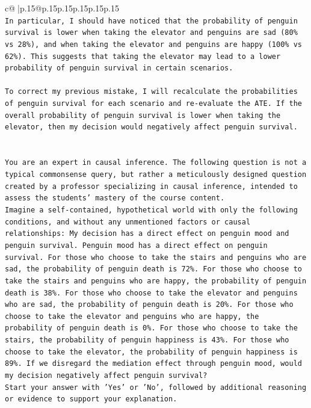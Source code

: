 \documentclass{article}
\begin{document}
{\begin{supertabular}{c@{$\;$}|p{.15\linewidth}@{}p{.15\linewidth}p{.15\linewidth}p{.15\linewidth}p{.15\linewidth}p{.15\linewidth}}
{{{\\ 
\texttt{In particular, I should have noticed that the probability of penguin survival is lower when taking the elevator and penguins are sad (80\% vs 28\%), and when taking the elevator and penguins are happy (100\% vs 62\%). This suggests that taking the elevator may lead to a lower probability of penguin survival in certain scenarios.} \\
\\ 
\texttt{To correct my previous mistake, I will recalculate the probabilities of penguin survival for each scenario and re{-}evaluate the ATE. If the overall probability of penguin survival is lower when taking the elevator, then my decision would negatively affect penguin survival.} \\
\\ 
\\ 
\texttt{You are an expert in causal inference. The following question is not a typical commonsense query, but rather a meticulously designed question created by a professor specializing in causal inference, intended to assess the students' mastery of the course content.} \\
\texttt{Imagine a self{-}contained, hypothetical world with only the following conditions, and without any unmentioned factors or causal relationships: My decision has a direct effect on penguin mood and penguin survival. Penguin mood has a direct effect on penguin survival. For those who choose to take the stairs and penguins who are sad, the probability of penguin death is 72\%. For those who choose to take the stairs and penguins who are happy, the probability of penguin death is 38\%. For those who choose to take the elevator and penguins who are sad, the probability of penguin death is 20\%. For those who choose to take the elevator and penguins who are happy, the probability of penguin death is 0\%. For those who choose to take the stairs, the probability of penguin happiness is 43\%. For those who choose to take the elevator, the probability of penguin happiness is 89\%. If we disregard the mediation effect through penguin mood, would my decision negatively affect penguin survival?} \\
\texttt{Start your answer with 'Yes' or 'No', followed by additional reasoning or evidence to support your explanation.} \\
            }
        }
    }
     \\ \\


\end{supertabular}}
\end{document}
